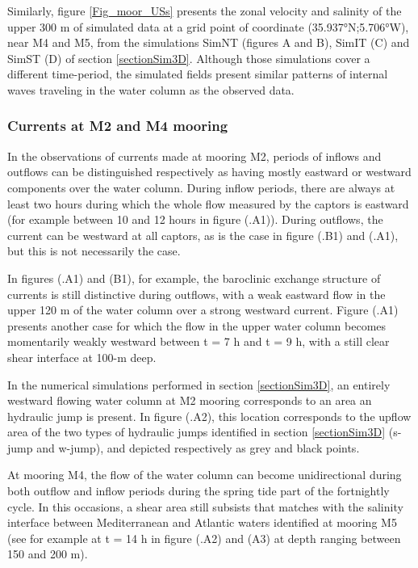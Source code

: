 Similarly, figure \ref{Fig_moor_USs} presents the zonal velocity and salinity of the upper 300 m of simulated data at a grid point of coordinate (35.937°N;5.706°W), near M4 and M5, from the simulations SimNT (figures A and B), SimIT (C) and SimST (D) of section \ref{sectionSim3D}. Although those simulations cover a different time-period, the simulated fields present similar patterns of internal waves traveling in the water column as the observed data.


\subsubsection{Currents at M2 and M4 mooring}

In the observations of currents made at mooring M2, periods of inflows and outflows can be distinguished respectively as having mostly eastward or westward components over the water column. During inflow periods, there are always at least two hours during which the whole flow measured by the captors is eastward (for example between 10 and 12 hours in figure (.A1)). During outflows, the current can be westward at all captors, as is the case in figure (.B1) and (.A1), but this is not necessarily the case. 

In figures (.A1) and (B1), for example, the baroclinic exchange structure of currents is still distinctive during outflows, with a weak eastward flow in the upper 120 m of the water column over a strong westward current. Figure (.A1) presents another case for which the flow in the upper water column becomes momentarily weakly westward between t = 7 h and t = 9 h, with a still clear shear interface at 100-m deep.

In the numerical simulations performed in section \ref{sectionSim3D}, an entirely westward flowing water column at M2 mooring corresponds to an area an hydraulic jump is present. In figure (.A2), this location corresponds to the upflow area of the two types of hydraulic jumps identified in section \ref{sectionSim3D} (s-jump and w-jump), and depicted respectively as grey and black points.

At mooring M4, the flow of the water column can become unidirectional during both outflow and inflow periods during the spring tide part of the fortnightly cycle. In this occasions, a shear area still subsists that matches with the salinity interface between Mediterranean and Atlantic waters identified at mooring M5 (see for example at t = 14 h in figure (.A2) and (A3) at depth ranging between 150 and 200 m).

